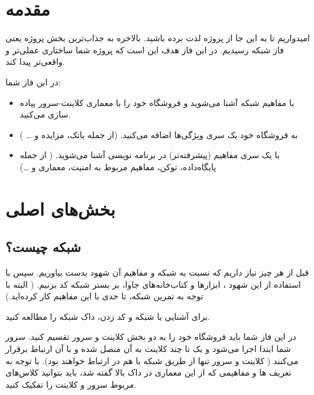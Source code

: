 \documentclass[]{article}
\begin{document}
\newpage

\section*{{\titr مقدمه}}
امیدواریم تا به این جا از پروژه لذت برده باشید. بالاخره به جذاب‌ترین بخش پروژه یعنی فاز شبکه رسیدیم. در این فاز هدف این است که پروژه شما ساختاری عملی‌تر و واقعی‌تر پیدا کند.

در این فاز شما:

\begin{itemize}


\item
 با مفاهیم شبکه آشنا می‌شوید و فروشگاه خود را با معماری کلاینت-سرور پیاده سازی می‌کنید.
 
 \item
 
به فروشگاه خود یک سری ویژگی‌ها اضافه می‌کنید. (از جمله بانک، مزایده و … )

\item
با یک سری مفاهیم (پیشرفته‌تر)‌ در برنامه نویسی آشنا می‌شوید. ( از جمله پایگاه‌داده، توکن، مفاهیم مربوط به امنیت، معماری  و …)


\end{itemize}
\newpage
\section*{{\titr بخش‌های اصلی }}

\subsection*{{\titr شبکه چیست؟}}

قبل از هر چیز نیاز داریم که نسبت به شبکه و مفاهیم آن شهود بدست بیاوریم. سپس با استفاده از این شهود ، ابزار‌ها و کتاب‌خانه‌های جاوا، بر بستر شبکه کد بزنیم. ( البته با توجه به تمرین شبکه، تا حدی با این مفاهیم کار کرده‌اید.)


برای آشنایی با شبکه و کد زدن، \textcolor{CustomColor}{داک شبکه} را مطالعه کنید.


در این فاز شما باید فروشگاه خود را به دو بخش کلاینت و سرور تقسیم کنید. سرور شما ابتدا اجرا می‌شود و یک تا چند کلاینت به آن متصل شده و با آن ارتباط برقرار می‌کنند ( کلاینت و سرور تنها از طریق شبکه با هم در ارتباط خواهند بود). با توجه به تعریف ها و مفاهیمی که از این معماری در داک بالا گفته شد، باید  بتوانید کلاس‌های مربوط سرور و کلاینت را تفکیک کنید.
\end{document}
